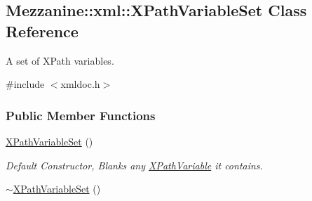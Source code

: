 \hypertarget{classMezzanine_1_1xml_1_1XPathVariableSet}{
\subsection{Mezzanine::xml::XPathVariableSet Class Reference}
\label{classMezzanine_1_1xml_1_1XPathVariableSet}
}


A set of XPath variables.  




{\ttfamily \#include $<$xmldoc.h$>$}

\subsubsection*{Public Member Functions}
\begin{DoxyCompactItemize}
\item 
\hypertarget{classMezzanine_1_1xml_1_1XPathVariableSet_ab8c705561fd7bd9f8ab7a0f112ef43da}{
\hyperlink{classMezzanine_1_1xml_1_1XPathVariableSet_ab8c705561fd7bd9f8ab7a0f112ef43da}{XPathVariableSet} ()}
\label{classMezzanine_1_1xml_1_1XPathVariableSet_ab8c705561fd7bd9f8ab7a0f112ef43da}

\begin{DoxyCompactList}\small\item\em Default Constructor, Blanks any \hyperlink{classMezzanine_1_1xml_1_1XPathVariable}{XPathVariable} it contains. \item\end{DoxyCompactList}\item 
\hypertarget{classMezzanine_1_1xml_1_1XPathVariableSet_a860dbdbf76b343e70b3892513ce40e0b}{
\hyperlink{classMezzanine_1_1xml_1_1XPathVariableSet_a860dbdbf76b343e70b3892513ce40e0b}{$\sim$XPathVariableSet} ()}
\label{classMezzanine_1_1xml_1_1XPathVariableSet_a860dbdbf76b343e70b3892513ce40e0b}


\end{DoxyCompactItemize}

